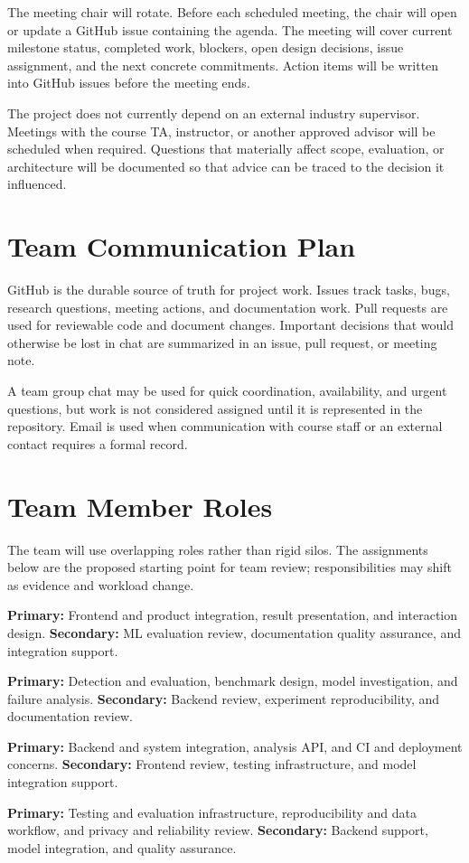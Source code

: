 \documentclass{article}
\begin{document}
The meeting chair will rotate. Before each scheduled meeting, the chair will open or update a GitHub issue containing the agenda. The meeting will cover current milestone status, completed work, blockers, open design decisions, issue assignment, and the next concrete commitments. Action items will be written into GitHub issues before the meeting ends.

The project does not currently depend on an external industry supervisor. Meetings with the course TA, instructor, or another approved advisor will be scheduled when required. Questions that materially affect scope, evaluation, or architecture will be documented so that advice can be traced to the decision it influenced.

\section{Team Communication Plan}

GitHub is the durable source of truth for project work. Issues track tasks, bugs, research questions, meeting actions, and documentation work. Pull requests are used for reviewable code and document changes. Important decisions that would otherwise be lost in chat are summarized in an issue, pull request, or meeting note.

A team group chat may be used for quick coordination, availability, and urgent questions, but work is not considered assigned until it is represented in the repository. Email is used when communication with course staff or an external contact requires a formal record.

\section{Team Member Roles}

The team will use overlapping roles rather than rigid silos. The assignments below are the proposed starting point for team review; responsibilities may shift as evidence and workload change.

\begin{description}[style=nextline]
    \item[Calvin Salsali] \textbf{Primary:} Frontend and product integration, result presentation, and interaction design. \textbf{Secondary:} ML evaluation review, documentation quality assurance, and integration support.
    \item[Raymond Tao] \textbf{Primary:} Detection and evaluation, benchmark design, model investigation, and failure analysis. \textbf{Secondary:} Backend review, experiment reproducibility, and documentation review.
    \item[Jaden Moore] \textbf{Primary:} Backend and system integration, analysis API, and CI and deployment concerns. \textbf{Secondary:} Frontend review, testing infrastructure, and model integration support.
    \item[Richard Han] \textbf{Primary:} Testing and evaluation infrastructure, reproducibility and data workflow, and privacy and reliability review. \textbf{Secondary:} Backend support, model integration, and quality assurance.
\end{description}
\end{document}
